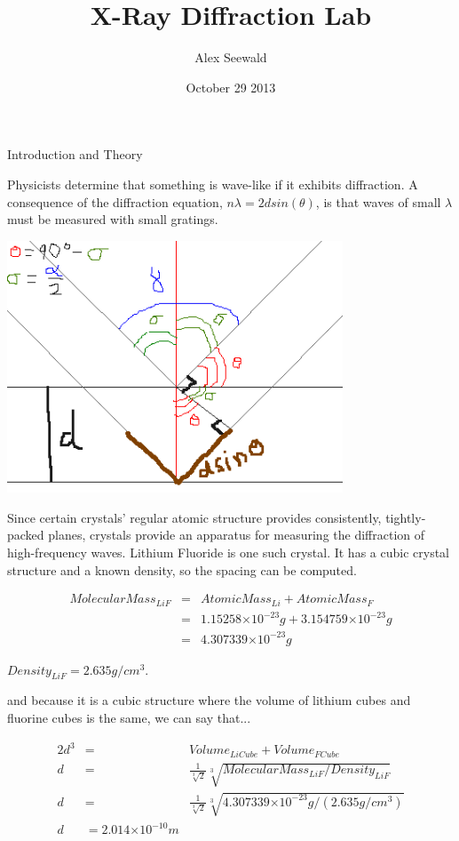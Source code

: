 \documentclass{article}
\providecommand{\e}[1]{\ensuremath{\times 10^{#1}}}
\begin{document}
\title{X-Ray Diffraction Lab}
\author{Alex Seewald}
\date{October 29 2013}
\maketitle

\begin{center} Introduction and Theory \end{center}

Physicists determine that something is wave-like if it exhibits diffraction. A consequence of the diffraction equation, $n \lambda = 2d sin(\theta) $, is that waves of small $\lambda$ must be measured with small gratings.

\includegraphics[width=10cm]{images/Derivation}

Since certain crystals' regular atomic structure provides consistently, tightly-packed planes, crystals provide an apparatus for measuring the diffraction of high-frequency waves. Lithium Fluoride is one such crystal. It has a cubic crystal structure and a known density, so the spacing can be computed.

\begin{align*}
MolecularMass_{LiF} & = & AtomicMass_{Li} + AtomicMass_{F} \\
                     & = & 1.15258\e{-23} g + 3.154759\e{-23} g \\
                     & = & 4.307339 \e{-23} g 
\end{align*}

$Density_{LiF} = 2.635 g / cm^3. $

and because it is a cubic structure where the volume of lithium cubes and fluorine cubes is the same, we can say that...

\begin{align*}
2 d^3  & = & Volume_{LiCube} + Volume_{FCube} \\    
d & = & \frac{1}{\sqrt[3]{2}} \sqrt[3]{MolecularMass_{LiF} / Density_{LiF}} \\
d & = & \frac{1}{\sqrt[3]{2}} \sqrt[3]{4.307339\e{-23} g / (2.635 g / cm^3)} \\
d &= 2.014\e{-10}m
\end{align*}
\end{document}

